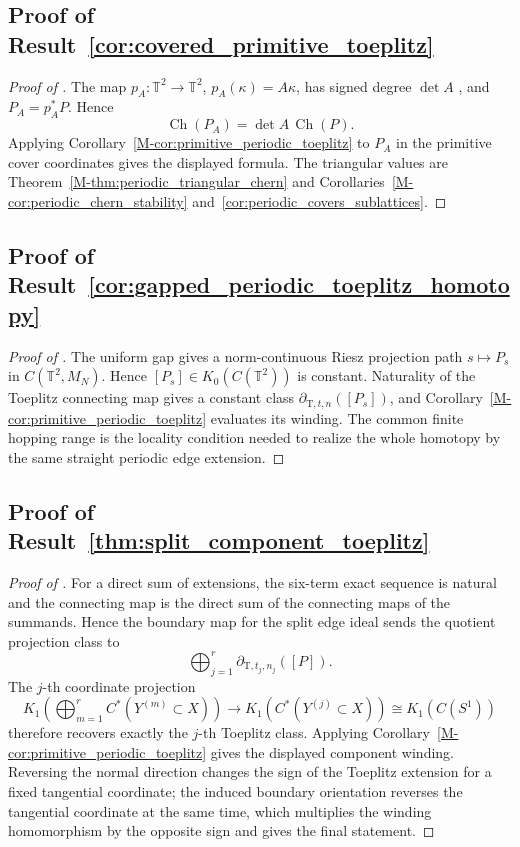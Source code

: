 \documentclass[11pt]{article}
\numberwithin{equation}{section}
\theoremstyle{definition}
\theoremstyle{remark}
\newcommand{\Ch}{\operatorname{Ch}}
\begin{document}
\subsection{Proof of Result~\ref{cor:covered_primitive_toeplitz}}\label{app:proof:cor:covered_primitive_toeplitz}
\begin{proof}[Proof of ]
The map \(p_A:\mathbb T^2\to\mathbb T^2\), \(p_A(\kappa)=A\kappa\), has signed degree
\(\det A\) \cite{Hatcher}, and \(P_A=p_A^*P\). Hence
\[
\Ch(P_A)=\det A\,\Ch(P).
\]
Applying Corollary~\ref{M-cor:primitive_periodic_toeplitz} to \(P_A\) in the primitive cover
coordinates gives the displayed formula. The triangular values are Theorem~\ref{M-thm:periodic_triangular_chern}
and Corollaries~\ref{M-cor:periodic_chern_stability} and~\ref{cor:periodic_covers_sublattices}.
\end{proof}

\subsection{Proof of Result~\ref{cor:gapped_periodic_toeplitz_homotopy}}\label{app:proof:cor:gapped_periodic_toeplitz_homotopy}
\begin{proof}[Proof of ]
The uniform gap gives a norm-continuous Riesz projection path \(s\mapsto P_s\) in
\(C(\mathbb T^2,M_N)\). Hence \([P_s]\in K_0(C(\mathbb T^2))\) is constant. Naturality of the
Toeplitz connecting map gives a constant class
\(\partial_{\mathrm T,t,n}([P_s])\), and Corollary~\ref{M-cor:primitive_periodic_toeplitz} evaluates
its winding. The common finite hopping range is the locality condition needed to realize the whole
homotopy by the same straight periodic edge extension.
\end{proof}

\subsection{Proof of Result~\ref{thm:split_component_toeplitz}}\label{app:proof:thm:split_component_toeplitz}
\begin{proof}[Proof of ]
For a direct sum of extensions, the six-term exact sequence is natural and the connecting map is
the direct sum of the connecting maps of the summands. Hence the boundary map for the split edge
ideal sends the quotient projection class to
\[
\bigoplus_{j=1}^r \partial_{\mathrm T,t_j,n_j}([P]).
\]
The \(j\)-th coordinate projection
\[
K_1\!\left(\bigoplus_{m=1}^r C^*(Y^{(m)}\subset X)\right)
\longrightarrow
K_1(C^*(Y^{(j)}\subset X))
\cong K_1(C(S^1))
\]
therefore recovers exactly the \(j\)-th Toeplitz class. Applying
Corollary~\ref{M-cor:primitive_periodic_toeplitz} gives the displayed component winding. Reversing
the normal direction changes the sign of the Toeplitz extension for a fixed tangential coordinate;
the induced boundary orientation reverses the tangential coordinate at the same time, which
multiplies the winding homomorphism by the opposite sign and gives the final statement.
\end{proof}
\end{document}
